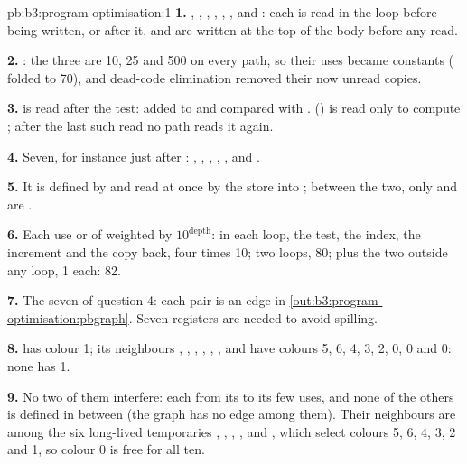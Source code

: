 \begin{solution}{pb:b3:program-optimisation:1}
\textbf{1.} , , , , , ,  and : each is read in the loop before being written, or after it.  and  are written at the top of the body before any read.

\textbf{2.} : the three are 10, 25 and 500 on every path, so their uses became constants ( folded to 70), and dead-code elimination removed their now unread copies.

\textbf{3.}  is read after the test: added to  and compared with .  () is read only to compute ; after the last such read no path reads it again.

\textbf{4.} Seven, for instance just after : , , , , ,  and .

\textbf{5.} It is defined by  and read at once by the store into ; between the two, only  and  are .

\textbf{6.} Each use or  of  weighted by $10^{\text{depth}}$: in each loop, the test, the index, the increment and the copy back, four times 10; two loops, 80; plus the two  outside any loop, 1 each: 82.

\textbf{7.} The seven of question 4: each pair is an edge in \cref{out:b3:program-optimisation:pbgraph}. Seven registers are needed to avoid spilling.

\textbf{8.}  has colour 1; its neighbours , , , , , ,  and  have colours 5, 6, 4, 3, 2, 0, 0 and 0: none has 1.

\textbf{9.} No two of them interfere: each  from its  to its few uses, and none of the others is defined in between (the graph has no edge among them). Their neighbours are among the six long-lived temporaries , , , ,  and , which select colours 5, 6, 4, 3, 2 and 1, so colour 0 is free for all ten.


\end{solution}
